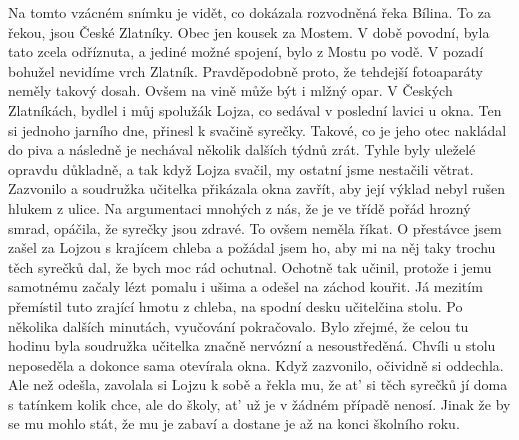 
Na tomto vzácném snímku je vidět, co dokázala rozvodněná řeka Bílina.
To za řekou, jsou České Zlatníky. Obec jen kousek za Mostem. V době
povodní, byla tato zcela odříznuta, a jediné možné spojení, bylo z
Mostu po vodě. V pozadí bohužel nevidíme vrch Zlatník. Pravděpodobně
proto, že tehdejší fotoaparáty neměly takový dosah. Ovšem na vině může
být i mlžný opar. V Českých Zlatníkách, bydlel i můj spolužák Lojza,
co sedával v poslední lavici u okna. Ten si jednoho jarního dne,
přinesl k svačině syrečky. Takové, co je jeho otec nakládal do piva a
následně je nechával několik dalších týdnů zrát. Tyhle byly uleželé
opravdu důkladně, a tak když Lojza svačil, my ostatní jsme nestačili
větrat. Zazvonilo a soudružka učitelka přikázala okna zavřít, aby její
výklad nebyl rušen hlukem z ulice. Na argumentaci mnohých z nás, že je
ve třídě pořád hrozný smrad, opáčila, že syrečky jsou zdravé. To ovšem
neměla říkat. O přestávce jsem zašel za Lojzou s krajícem chleba a
požádal jsem ho, aby mi na něj taky trochu těch syrečků dal, že bych
moc rád ochutnal. Ochotně tak učinil, protože i jemu samotnému začaly
lézt pomalu i ušima a odešel na záchod kouřit. Já mezitím přemístil
tuto zrající hmotu z chleba, na spodní desku učitelčina stolu. Po
několika dalších minutách, vyučování pokračovalo. Bylo zřejmé, že
celou tu hodinu byla soudružka učitelka značně nervózní a
nesoustředěná. Chvíli u stolu neposeděla a dokonce sama otevírala
okna. Když zazvonilo, očividně si oddechla. Ale než odešla, zavolala
si Lojzu k sobě a řekla mu, že at' si těch syrečků jí doma s tatínkem
kolik chce, ale do školy, at' už je v žádném případě nenosí. Jinak že
by se mu mohlo stát, že mu je zabaví a dostane je až na konci školního
roku.
